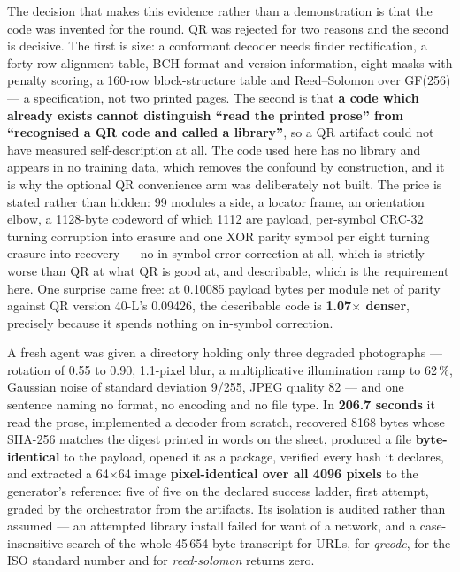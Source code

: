 \documentclass[10pt,twocolumn,letterpaper]{article}
\begin{document}
The decision that makes this evidence rather than a demonstration is that the code was invented for the round. QR was rejected for two reasons and the second is decisive. The first is size: a conformant decoder needs finder rectification, a forty-row alignment table, BCH format and version information, eight masks with penalty scoring, a 160-row block-structure table and Reed--Solomon over GF(256) --- a specification, not two printed pages. The second is that \textbf{a code which already exists cannot distinguish ``read the printed prose'' from ``recognised a QR code and called a library''}, so a QR artifact could not have measured self-description at all. The code used here has no library and appears in no training data, which removes the confound by construction, and it is why the optional QR convenience arm was deliberately not built. The price is stated rather than hidden: 99 modules a side, a locator frame, an orientation elbow, a 1128-byte codeword of which 1112 are payload, per-symbol CRC-32 turning corruption into erasure and one XOR parity symbol per eight turning erasure into recovery --- no in-symbol error correction at all, which is strictly worse than QR at what QR is good at, and describable, which is the requirement here. One surprise came free: at 0.10085 payload bytes per module net of parity against QR version 40-L's 0.09426, the describable code is \textbf{1.07$\times$ denser}, precisely because it spends nothing on in-symbol correction.

A fresh agent was given a directory holding only three degraded photographs --- rotation of 0.55 to 0.90\textdegree{}, 1.1-pixel blur, a multiplicative illumination ramp to 62\,\%, Gaussian noise of standard deviation 9/255, JPEG quality 82 --- and one sentence naming no format, no encoding and no file type. In \textbf{206.7 seconds} it read the prose, implemented a decoder from scratch, recovered 8168 bytes whose SHA-256 matches the digest printed in words on the sheet, produced a file \textbf{byte-identical} to the payload, opened it as a package, verified every hash it declares, and extracted a 64$\times$64 image \textbf{pixel-identical over all 4096 pixels} to the generator's reference: five of five on the declared success ladder, first attempt, graded by the orchestrator from the artifacts. Its isolation is audited rather than assumed --- an attempted library install failed for want of a network, and a case-insensitive search of the whole 45\,654-byte transcript for URLs, for \emph{qrcode}, for the ISO standard number and for \emph{reed-solomon} returns zero.
\end{document}
